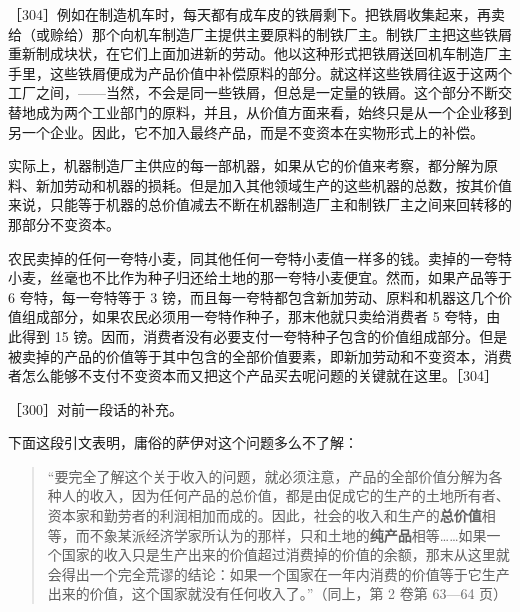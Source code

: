 ［304］\fontbox{~\{}例如在制造机车时，每天都有成车皮的铁屑剩下。把铁屑收集起来，再卖给（或赊给）那个向机车制造厂主提供主要原料的制铁厂主。制铁厂主把这些铁屑重新制成块状，在它们上面加进新的劳动。他以这种形式把铁屑送回机车制造厂主手里，这些铁屑便成为产品价值中补偿原料的部分。就这样这些铁屑往返于这两个工厂之间，——当然，不会是同一些铁屑，但总是一定量的铁屑。这个部分不断交替地成为两个工业部门的原料，并且，从价值方面来看，始终只是从一个企业移到另一个企业。因此，它不加入最终产品，而是不变资本在实物形式上的补偿。

实际上，机器制造厂主供应的每一部机器，如果从它的价值来考察，都分解为原料、新加劳动和机器的损耗。但是加入其他领域生产的这些机器的总数，按其价值来说，只能等于机器的总价值减去不断在机器制造厂主和制铁厂主之间来回转移的那部分不变资本。

农民卖掉的任何一夸特小麦，同其他任何一夸特小麦值一样多的钱。卖掉的一夸特小麦，丝毫也不比作为种子归还给土地的那一夸特小麦便宜。然而，如果产品等于 6 夸特，每一夸特等于 3 镑，而且每一夸特都包含新加劳动、原料和机器这几个价值组成部分，如果农民必须用一夸特作种子，那末他就只卖给消费者 5 夸特，由此得到 15 镑。因而，消费者没有必要支付一夸特种子包含的价值组成部分。但是被卖掉的产品的价值等于其中包含的全部价值要素，即新加劳动和不变资本，消费者怎么能够不支付不变资本而又把这个产品买去呢问题的关键就在这里。\fontbox{\}~}［304］

［300］\fontbox{~\{}对前一段话的补充。

下面这段引文表明，庸俗的萨伊对这个问题多么不了解：

\begin{quote}“要完全了解这个关于收入的问题，就必须注意，产品的全部价值分解为各种人的收入，因为任何产品的总价值，都是由促成它的生产的土地所有者、资本家和勤劳者的利润相加而成的。因此，社会的收入和生产的\textbf{总价值}相等，而不象某派经济学家所认为的那样，只和土地的\textbf{纯产品}相等……如果一个国家的收入只是生产出来的价值超过消费掉的价值的余额，那末从这里就会得出一个完全荒谬的结论：如果一个国家在一年内消费的价值等于它生产出来的价值，这个国家就没有任何收入了。”（同上，第 2 卷第 63—64 页）\end{quote}

